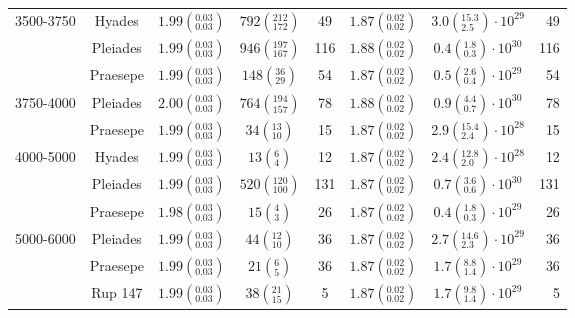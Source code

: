 \begin{tabular}{lccccccr}
3500-3750 & Hyades &  $1.99\left(^{0.03}_{0.03}\right)$ &     $792\left(^{212}_{172}\right)$ &             49 &  $1.87\left(^{0.02}_{0.02}\right)$ &  $3.0\left(^{15.3}_{2.5}\right)\cdot 10^{29}$ &               49 \\
          & Pleiades &  $1.99\left(^{0.03}_{0.03}\right)$ &     $946\left(^{197}_{167}\right)$ &            116 &  $1.88\left(^{0.02}_{0.02}\right)$ &   $0.4\left(^{1.8}_{0.3}\right)\cdot 10^{30}$ &              116 \\
          & Praesepe &  $1.99\left(^{0.03}_{0.03}\right)$ &       $148\left(^{36}_{29}\right)$ &             54 &  $1.87\left(^{0.02}_{0.02}\right)$ &   $0.5\left(^{2.6}_{0.4}\right)\cdot 10^{29}$ &               54 \\
3750-4000 & Pleiades &  $2.00\left(^{0.03}_{0.03}\right)$ &     $764\left(^{194}_{157}\right)$ &             78 &  $1.88\left(^{0.02}_{0.02}\right)$ &   $0.9\left(^{4.4}_{0.7}\right)\cdot 10^{30}$ &               78 \\
          & Praesepe &  $1.99\left(^{0.03}_{0.03}\right)$ &        $34\left(^{13}_{10}\right)$ &             15 &  $1.87\left(^{0.02}_{0.02}\right)$ &  $2.9\left(^{15.4}_{2.4}\right)\cdot 10^{28}$ &               15 \\
4000-5000 & Hyades &  $1.99\left(^{0.03}_{0.03}\right)$ &          $13\left(^{6}_{4}\right)$ &             12 &  $1.87\left(^{0.02}_{0.02}\right)$ &  $2.4\left(^{12.8}_{2.0}\right)\cdot 10^{28}$ &               12 \\
          & Pleiades &  $1.99\left(^{0.03}_{0.03}\right)$ &     $520\left(^{120}_{100}\right)$ &            131 &  $1.87\left(^{0.02}_{0.02}\right)$ &   $0.7\left(^{3.6}_{0.6}\right)\cdot 10^{30}$ &              131 \\
          & Praesepe &  $1.98\left(^{0.03}_{0.03}\right)$ &          $15\left(^{4}_{3}\right)$ &             26 &  $1.87\left(^{0.02}_{0.02}\right)$ &   $0.4\left(^{1.8}_{0.3}\right)\cdot 10^{29}$ &               26 \\
5000-6000 & Pleiades &  $1.99\left(^{0.03}_{0.03}\right)$ &        $44\left(^{12}_{10}\right)$ &             36 &  $1.87\left(^{0.02}_{0.02}\right)$ &  $2.7\left(^{14.6}_{2.3}\right)\cdot 10^{29}$ &               36 \\
          & Praesepe &  $1.99\left(^{0.03}_{0.03}\right)$ &          $21\left(^{6}_{5}\right)$ &             36 &  $1.87\left(^{0.02}_{0.02}\right)$ &   $1.7\left(^{8.8}_{1.4}\right)\cdot 10^{29}$ &               36 \\
          & Rup 147 &  $1.99\left(^{0.03}_{0.03}\right)$ &        $38\left(^{21}_{15}\right)$ &              5 &  $1.87\left(^{0.02}_{0.02}\right)$ &   $1.7\left(^{9.8}_{1.4}\right)\cdot 10^{29}$ &                5 \\
\hline

\end{tabular}
